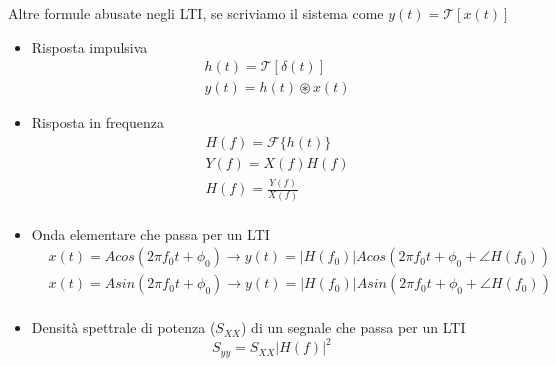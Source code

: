 \documentclass{article}
\begin{document}
Altre formule abusate negli LTI, se scriviamo il sistema come $y(t) = \mathcal{T}[x(t)]$
\begin{itemize}
  \item Risposta impulsiva \begin{align*}
    &h(t) = \mathcal{T}[\delta (t)]\\
    &y(t) = h(t) \circledast x(t)
  \end{align*}
  
  \item Risposta in frequenza \begin{align*}
    &H(f) = \mathcal{F}\{h(t)\}\\
    &Y(f) = X(f) H(f)\\
    &H(f) = \frac{Y(f)}{X(f)}\\
  \end{align*}
    
  \item Onda elementare che passa per un LTI \begin{align*}
    &x(t) = A cos(2\pi f_0t + \phi_0) \to y(t) = \lvert H(f_0) \rvert A cos(2\pi f_0t + \phi_0 + \angle H(f_0))\\
    &x(t) = A sin(2\pi f_0t + \phi_0) \to y(t) = \lvert H(f_0) \rvert A sin(2\pi f_0t + \phi_0 + \angle H(f_0))\\
  \end{align*}
    
  \item Densità spettrale di potenza ($S_{XX}$) di un segnale che passa per un LTI \begin{equation*}
    S_{yy} = S_{XX} \lvert H(f) \rvert ^2
  \end {equation*}
\end{itemize}
\end{document}
